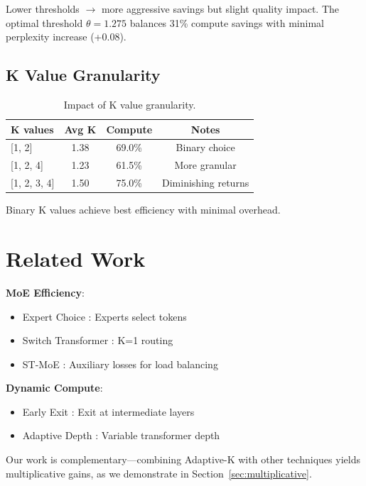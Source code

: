\documentclass{article}
\begin{document}
Lower thresholds $\rightarrow$ more aggressive savings but slight quality impact. The optimal threshold $\theta = 1.275$ balances 31\% compute savings with minimal perplexity increase (+0.08).

\subsection{K Value Granularity}

\begin{table}[h]
\centering
\begin{tabular}{lccc}
\toprule
\textbf{K values} & \textbf{Avg K} & \textbf{Compute} & \textbf{Notes} \\
\midrule
{[}1, 2{]} & 1.38 & 69.0\% & Binary choice \\
{[}1, 2, 4{]} & 1.23 & 61.5\% & More granular \\
{[}1, 2, 3, 4{]} & 1.50 & 75.0\% & Diminishing returns \\
\bottomrule
\end{tabular}
\caption{Impact of K value granularity.}
\label{tab:granularity}
\end{table}

Binary K values achieve best efficiency with minimal overhead.

\section{Related Work}

\textbf{MoE Efficiency}:
\begin{itemize}
    \item Expert Choice \citep{zhou2022mixture}: Experts select tokens
    \item Switch Transformer \citep{fedus2022switch}: K=1 routing
    \item ST-MoE \citep{zoph2022st}: Auxiliary losses for load balancing
\end{itemize}

\textbf{Dynamic Compute}:
\begin{itemize}
    \item Early Exit \citep{schwartz2020right}: Exit at intermediate layers
    \item Adaptive Depth \citep{elbayad2020depth}: Variable transformer depth
\end{itemize}

Our work is complementary---combining Adaptive-K with other techniques yields multiplicative gains, as we demonstrate in Section~\ref{sec:multiplicative}.
\end{document}
